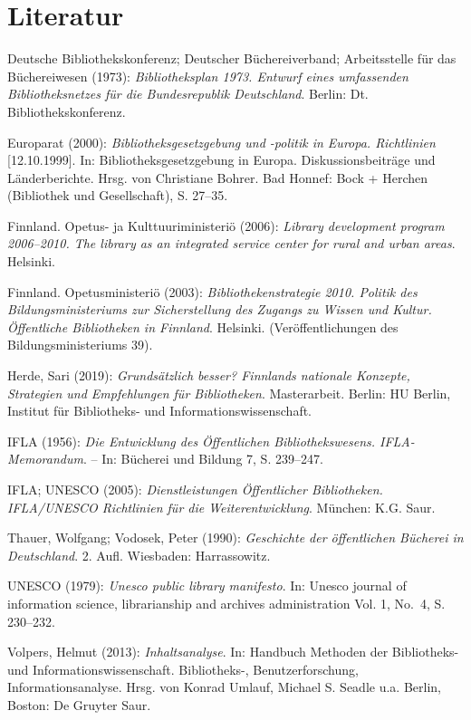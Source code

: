 \documentclass[a4paper,
fontsize=11pt,
oneside,
numbers=noperiodatend,
parskip=half-,
bibliography=totoc,
final
]{scrartcl}
\begin{document}
\hypertarget{literatur}{%
\section{Literatur}\label{literatur}}

Deutsche Bibliothekskonferenz; Deutscher Büchereiverband; Arbeitsstelle
für das Büchereiwesen (1973): \emph{Bibliotheksplan 1973. Entwurf eines
umfassenden Bibliotheksnetzes für die Bundesrepublik Deutschland}.
Berlin: Dt. Bibliothekskonferenz.

Europarat (2000): \emph{Bibliotheksgesetzgebung und -politik in Europa.
Richtlinien} {[}12.10.1999{]}. In: Bibliotheksgesetzgebung in Europa.
Diskussionsbeiträge und Länderberichte. Hrsg. von Christiane Bohrer. Bad
Honnef: Bock + Herchen (Bibliothek und Gesellschaft), S. 27--35.

Finnland. Opetus- ja Kulttuuriministeriö (2006): \emph{Library
development program 2006--2010. The library as an integrated service
center for rural and urban areas}. Helsinki.

Finnland. Opetusministeriö (2003): \emph{Bibliothekenstrategie 2010.
Politik des Bildungsministeriums zur Sicherstellung des Zugangs zu
Wissen und Kultur. Öffentliche Bibliotheken in Finnland}. Helsinki.
(Veröffentlichungen des Bildungsministeriums 39).

Herde, Sari (2019): \emph{Grundsätzlich besser? Finnlands nationale
Konzepte, Strategien und Empfehlungen für Bibliotheken}. Masterarbeit.
Berlin: HU Berlin, Institut für Bibliotheks- und
Informationswissenschaft.

IFLA (1956): \emph{Die Entwicklung des Öffentlichen Bibliothekswesens.
IFLA-Memorandum}. -- In: Bücherei und Bildung 7, S. 239--247.

IFLA; UNESCO (2005): \emph{Dienstleistungen Öffentlicher Bibliotheken.
IFLA/UNESCO Richtlinien für die Weiterentwicklung}. München: K.G. Saur.

Thauer, Wolfgang; Vodosek, Peter (1990): \emph{Geschichte der
öffentlichen Bücherei in Deutschland}. 2. Aufl. Wiesbaden: Harrassowitz.

UNESCO (1979): \emph{Unesco public library manifesto}. In: Unesco
journal of information science, librarianship and archives
administration Vol. 1, No.~4, S. 230--232.

Volpers, Helmut (2013): \emph{Inhaltsanalyse}. In: Handbuch Methoden der
Bibliotheks- und Informationswissenschaft. Bibliotheks-,
Benutzerforschung, Informationsanalyse. Hrsg. von Konrad Umlauf, Michael
S. Seadle u.a. Berlin, Boston: De Gruyter Saur.
\end{document}
